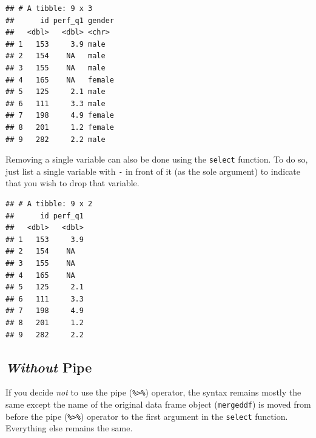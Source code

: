 \documentclass[]{book}
\newenvironment{Shaded}{\begin{snugshade}}{\end{snugshade}}
\newcommand{\KeywordTok}[1]{\textcolor[rgb]{0.13,0.29,0.53}{\textbf{#1}}}
\newcommand{\StringTok}[1]{\textcolor[rgb]{0.31,0.60,0.02}{#1}}
\newcommand{\CommentTok}[1]{\textcolor[rgb]{0.56,0.35,0.01}{\textit{#1}}}
\newcommand{\OperatorTok}[1]{\textcolor[rgb]{0.81,0.36,0.00}{\textbf{#1}}}
\newcommand{\NormalTok}[1]{#1}
\begin{document}
\begin{Shaded}
\end{Shaded}

\begin{verbatim}
## # A tibble: 9 x 3
##      id perf_q1 gender
##   <dbl>   <dbl> <chr> 
## 1   153     3.9 male  
## 2   154    NA   male  
## 3   155    NA   male  
## 4   165    NA   female
## 5   125     2.1 male  
## 6   111     3.3 male  
## 7   198     4.9 female
## 8   201     1.2 female
## 9   282     2.2 male
\end{verbatim}

Removing a single variable can also be done using the \texttt{select}
function. To do so, just list a single variable with \texttt{-} in front
of it (as the sole argument) to indicate that you wish to drop that
variable.

\begin{Shaded}
\end{Shaded}

\begin{verbatim}
## # A tibble: 9 x 2
##      id perf_q1
##   <dbl>   <dbl>
## 1   153     3.9
## 2   154    NA  
## 3   155    NA  
## 4   165    NA  
## 5   125     2.1
## 6   111     3.3
## 7   198     4.9
## 8   201     1.2
## 9   282     2.2
\end{verbatim}

\subsection{\texorpdfstring{\emph{Without}
Pipe}{Without Pipe}}\label{without-pipe-1}

If you decide \emph{not} to use the pipe (\texttt{\%\textgreater{}\%})
operator, the syntax remains mostly the same except the name of the
original data frame object (\texttt{mergeddf}) is moved from before the
pipe (\texttt{\%\textgreater{}\%}) operator to the first argument in the
\texttt{select} function. Everything else remains the same.
\end{document}
